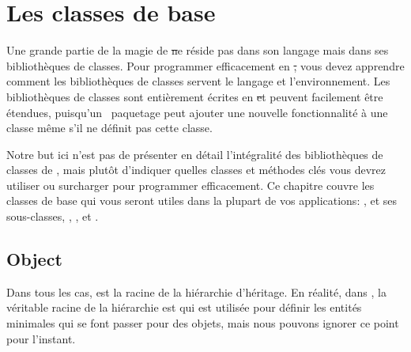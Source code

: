 \documentclass[a4paper,10pt,twoside]{book}
\begin{document}
	\renewcommand{\nnbb}[2]{} %
	\sloppy
\fi
\chapter{Les classes de base}
Une grande partie de la magie de \st ne réside pas dans son langage mais dans ses bibliothèques de classes. Pour programmer efficacement en \st, vous devez apprendre comment les bibliothèques de classes servent le langage et l'environnement. Les bibliothèques de classes sont entièrement écrites en \st et peuvent facilement être étendues, puisqu'un~ paquetage peut ajouter une nouvelle fonctionnalité à une classe même s'il ne définit pas cette classe. 

Notre but ici n'est pas de présenter en détail l'intégralité
des bibliothèques de classes de \pharo, mais plutôt d'indiquer
quelles classes et méthodes clés vous devrez utiliser ou surcharger 
pour programmer efficacement. Ce chapitre couvre les classes de base 
qui vous seront utiles dans la plupart de vos applications: ,  
et ses sous-classes, , ,  et .


\section{Object}

Dans tous les cas,  est la racine de la hiérarchie d'héritage. En réalité, dans \pharo , la véritable racine de la hiérarchie est  qui est utilisée pour définir les entités minimales qui se font passer pour des objets, mais nous pouvons ignorer ce point pour l'instant.
\end{document}
